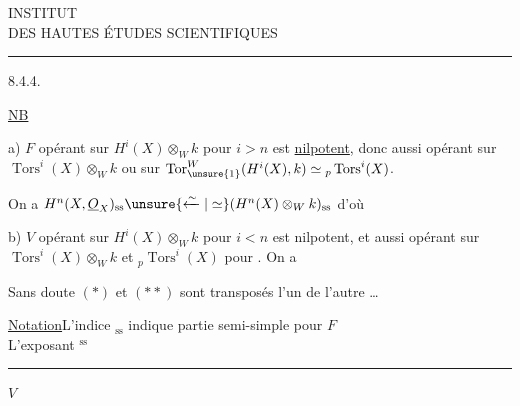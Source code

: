\begin{center}
INSTITUT\\
DES HAUTES ÉTUDES SCIENTIFIQUES\\
\rule{1.2cm}{.4pt}
\end{center}
8.4.4.

\uline{NB}

 a) $F$ opérant sur $H^i(X)\otimes_W k$ pour $i>n$ est \uline{nilpotent}, donc aussi opérant sur $\operatorname{Tors}^i(X)\otimes_W k$ ou sur $\operatorname{Tor}_{\unsure{1}}^W(H^i(X),k)\simeq{}_p\operatorname{Tors}^i(X)$.

On a $H^n(X,\underline{O}_X)_{\mathrm{ss}}\unsure{\xleftarrow{\sim}|\simeq}(H^n(X)\otimes_W k)_{\mathrm{ss}}$ d'où

 b) $V$ opérant sur $H^i(X)\otimes_W k$ pour $i<n$ est nilpotent, et aussi opérant sur $\operatorname{Tors}^i(X)\otimes_W k$ et ${}_p\operatorname{Tors}^i(X)$ pour . On a
\margin{$(**)$}

Sans doute $(*)$ et $(**)$ sont transposés l'un de l'autre \ldots

\uline{Notation}\quad L'indice ${}_{\mathrm{ss}}$ indique partie semi-simple pour $F$\\
L'exposant ${}^{\mathrm{ss}}$ \rule{7cm}{.3pt} $V$

